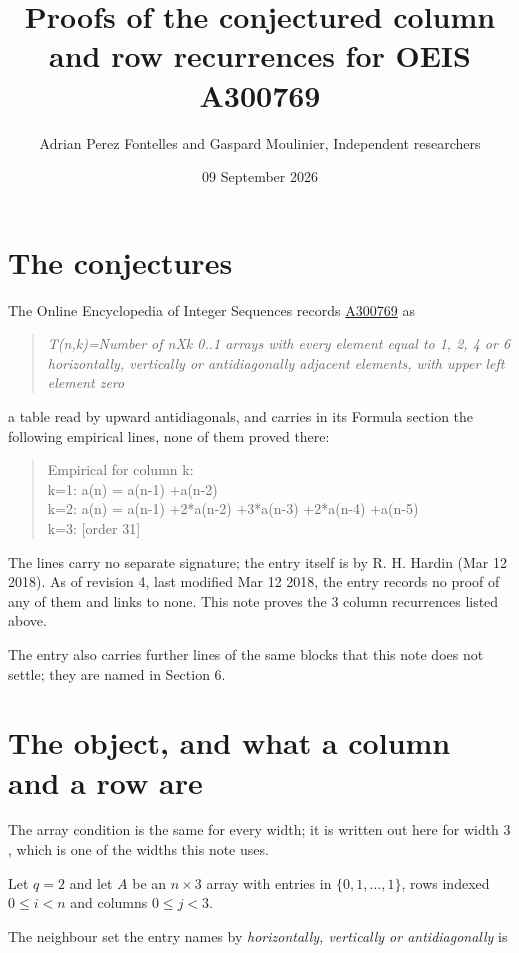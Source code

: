 \documentclass[11pt]{article}
\title{Proofs of the conjectured column and row recurrences for OEIS A300769}
\author{Adrian Perez Fontelles and Gaspard Moulinier, Independent researchers}
\date{09 September 2026}
\theoremstyle{definition}
\begin{document}
\maketitle
\section{The conjectures}

The Online Encyclopedia of Integer Sequences records \href{https://oeis.org/A300769}{A300769} as

\begin{quote}\itshape T(n,k)=Number of nXk 0..1 arrays with every element equal to 1, 2, 4 or 6 horizontally, vertically or antidiagonally adjacent elements, with upper left element zero\end{quote}

a table read by upward antidiagonals, and carries in its Formula section the following empirical lines, none of them proved there:

\begin{quote}\ttfamily Empirical for column k:\\
k=1: a(n) = a(n-1) +a(n-2)\\k=2: a(n) = a(n-1) +2*a(n-2) +3*a(n-3) +2*a(n-4) +a(n-5)\\k=3: [order 31]\end{quote}

The lines carry no separate signature; the entry itself is by R. H. Hardin (Mar 12 2018). As of revision 4, last modified Mar 12 2018, the entry records no proof of any of them and links to none. This note proves the 3 column recurrences listed above.

The entry also carries further lines of the same blocks that this note does not settle; they are named in Section 6.

\section{The object, and what a column and a row are}

The array condition is the same for every width; it is written out here for width $3$, which is one of the widths this note uses.

Let $q = 2$ and let $A$ be an $n \times 3$ array with entries in $\{0,1,\dots,1\}$, rows indexed $0 \le i < n$ and columns $0 \le j < 3$.

The neighbour set the entry names by {\itshape horizontally, vertically or antidiagonally} is
\end{document}
